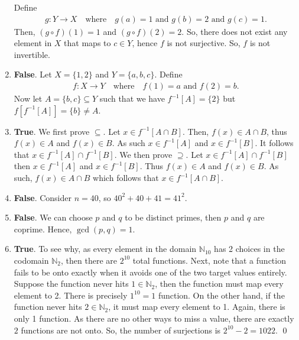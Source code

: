 \documentclass[12pt]{article}
\begin{document}
\begin{enumerate}[label=\textbf{(\alph*)}]
    Define
    \begin{align*}
        g:Y\to X\quad\text{where}\quad g(a)=1\text{ and }g(b)=2\text{ and } g(c)=1.
    \end{align*}
    Then, $\left(g\circ f\right)\left(1\right)=1$ and $\left(g\circ f\right)\left(2\right)=2$. So, there does not exist any element in $X$ that maps to $c\in Y$, hence $f$ is not surjective. So, $f$ is not invertible.
    \item \textbf{False}. Let $X=\{1,2\}$ and $Y=\{a,b,c\}$. Define
    \begin{align*}
        f:X\to Y\quad\text{where}\quad f(1)=a\text{ and } f(2)=b.
    \end{align*}
    Now let $A=\{b,c\}\subseteq Y$ such that we have $f^{-1}[A]=\{2\}$ but  $f[f^{-1}[A]]=\{b\}\neq A$.
    \item \textbf{True}. We first prove $\subseteq$. Let $x\in f^{-1}[A\cap B]$. Then, $f(x)\in A\cap B$, thus $f(x)\in A$ and $f(x)\in B$. As such $x\in f^{-1}[A]$ and $x\in f^{-1}[B]$. It follows that $x\in f^{-1}[A]\cap f^{-1}[B]$.
    \newline
    \newline We then prove $\supseteq$. Let $x\in f^{-1}[A]\cap f^{-1}[B] $ then  $x\in f^{-1}[A]$ and $x\in f^{-1}[B]$. Thus $f(x)\in A$ and $f(x)\in B$. As such, $f(x)\in A\cap B$ which follows that $x\in f^{-1}[A\cap B]$.
    \item \textbf{False}. Consider $n=40$, so $40^2+40+41=41^2$. 
    \item \textbf{False}. We can choose $p$ and $q$ to be distinct primes, then $p$ and $q$ are coprime. Hence, $\operatorname{gcd}(p,q)=1$.
    \item \textbf{True}. To see why, as every element in the domain $\mathbb{N}_{10}$ has 2 choices in the codomain $\mathbb{N}_2$, then there are $2^{10}$ total functions. 
    \newline
    \newline Next, note that a function fails to be onto exactly when it avoids one of the two target values entirely. Suppose the function never hits $1\in\mathbb{N}_2$, then the function must map every element to 2. There is precisely $1^{10}=1$ function. On the other hand, if the function never hits $2\in\mathbb{N}_{2}$, it must map every element to 1. Again, there is only 1 function.
    \newline
    \newline As there are no other ways to miss a value, there are exactly \(2\) functions are not onto. So, the number of surjections is $2^{10}-2=1022$. \qed 
\end{enumerate}
\end{document}
